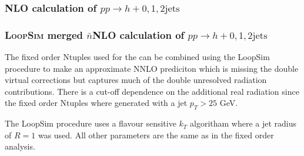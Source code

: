\subsubsection{NLO calculation of $pp\to h+0,1,2\text{jets}$}
\label{sec:hjetscomp:tools:fo:hnj}

\subsubsection{\textsc{LoopSim} merged $\bar{n}$NLO calculation of $pp\to h+0,1,2\text{jets}$}
\label{sec:hjetscomp:tools:fo:hnjloopsim}

The fixed order Ntuples used for the can be combined using the LoopSim procedure to make
an approximate NNLO prediciton which is missing the double virtual corrections but captures
much of the double unresolved radiation contributions. There is a cut-off dependence on the
additional real radiation since the fixed order Ntuples where generated with a jet $p_T>25$ GeV.

The LoopSim procedure uses a flavour sensitive $k_T$ algoritham where a jet radius of $R=1$ was used.
All other parameters are the same as in the fixed order analysis.
